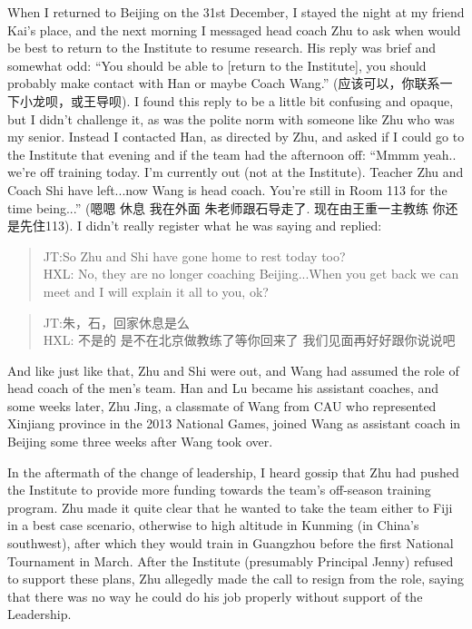\begin{CJK}{UTF8}{gbsn}
When I returned to Beijing on the 31st December, I stayed the night at my friend Kai's place, and the next morning I messaged head coach Zhu to ask when would be best to return to the Institute to resume research.  His reply was brief and somewhat odd: ``You should be able to [return to the Institute], you should probably make contact with Han or maybe Coach Wang.'' (应该可以，你联系一下小龙呗，或王导呗). I found this reply to be a little bit confusing and opaque, but I didn't challenge it, as was the polite norm with someone like Zhu who was my senior.  Instead I contacted Han, as directed by Zhu, and asked if I could go to the Institute that evening and if the team had the afternoon off: ``Mmmm yeah.. we're off training today. I'm currently out (not at the Institute). Teacher Zhu and Coach Shi have left...now Wang is head coach.  You're still in Room 113 for the time being...'' (嗯嗯 休息 我在外面 朱老师跟石导走了. 现在由王重一主教练 你还是先住113).  I didn't really register what he was saying and replied:

\begin{quotation}
  JT:So Zhu and Shi have gone home to rest today too? \\
  HXL: No, they are no longer coaching Beijing...When you get back we can meet and I will explain it all to you, ok? \\
\end{quotation}

\begin{quotation}
  JT:朱，石，回家休息是么 \\
  HXL: 不是的 是不在北京做教练了等你回来了 我们见面再好好跟你说说吧
\end{quotation}


And like just like that, Zhu and Shi were out, and Wang had assumed the role of head coach of the men's team.  Han and Lu became his assistant coaches, and some weeks later, Zhu Jing, a classmate of Wang from CAU who represented Xinjiang province in the 2013 National Games, joined Wang as assistant coach in Beijing some three weeks after Wang took over.

In the aftermath of the change of leadership, I heard gossip that Zhu had pushed the Institute to provide more funding towards the team's off-season training program.  Zhu  made it quite clear that he wanted to take the team either to Fiji in a best case scenario, otherwise to high altitude in Kunming (in China's southwest), after which they would train in Guangzhou before the first National Tournament in March.  After the Institute (presumably Principal Jenny) refused to support these plans, Zhu allegedly made the call to resign from the role, saying that there was no way he could do his job properly without support of the Leadership.


\end{CJK}
